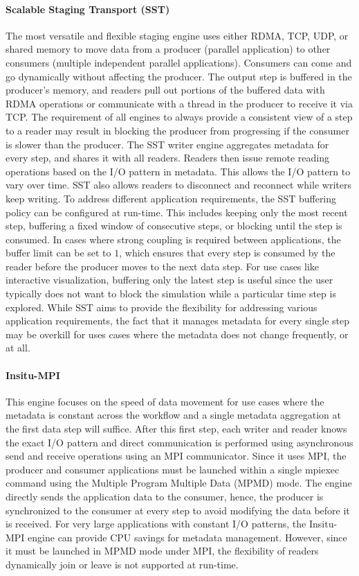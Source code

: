 \documentclass[x11names,table,xcdraw,graybox]{svmult}
\begin{document}
\paragraph{\textbf{Scalable Staging Transport (SST)}}
The most versatile and flexible staging engine uses either RDMA, TCP, UDP, or shared memory to move data from a producer (parallel application) to other consumers (multiple independent parallel applications). Consumers can come and go dynamically without affecting the producer. The output step is buffered in the producer's memory, and readers pull out portions of the buffered data with RDMA operations or communicate with a thread in the producer to receive it via TCP. The requirement of all engines to always provide a consistent view of a step to a reader may result in blocking the producer from progressing if the consumer is slower than the producer. The SST writer engine aggregates metadata for every step, and shares it with all readers. Readers then issue remote reading operations based on the I/O pattern in metadata. This allows the I/O pattern to vary over time. SST also allows readers to disconnect and reconnect while writers keep writing.
To address different application requirements, the SST buffering policy can be configured at run-time. This includes keeping only the most recent step, buffering a fixed window of consecutive steps, or blocking until the step is consumed. In cases where strong coupling is required between applications, the buffer limit can be set to $1$, which ensures that every step is consumed by the reader before the producer moves to the next data step.
For use cases like interactive visualization, buffering only the latest step is useful since the user typically does not want to block the simulation while a particular time step is explored.
While SST aims to provide the flexibility for addressing various application requirements, the fact that it manages metadata for every single step may be overkill for uses cases where the metadata does not change frequently, or at all.

\paragraph{\textbf{Insitu-MPI}}
This engine focuses on the speed of data movement for use cases where the metadata is constant across the workflow and a single metadata aggregation at the first data step will suffice. After this first step, each writer and reader knows the exact I/O pattern and direct communication is performed using asynchronous send and receive operations using an MPI  communicator. Since it uses MPI, the producer and consumer applications must be launched within a single mpiexec command using the Multiple Program Multiple Data (MPMD) mode. The engine directly sends the application data to the consumer, hence, the producer is synchronized to the consumer at every step to avoid modifying the data before it is received.
For very large applications with constant I/O patterns, the Insitu-MPI engine can provide CPU savings for metadata management. However, since it must be launched in MPMD mode under MPI, the flexibility of readers dynamically join or leave is not supported at run-time.
\end{document}
